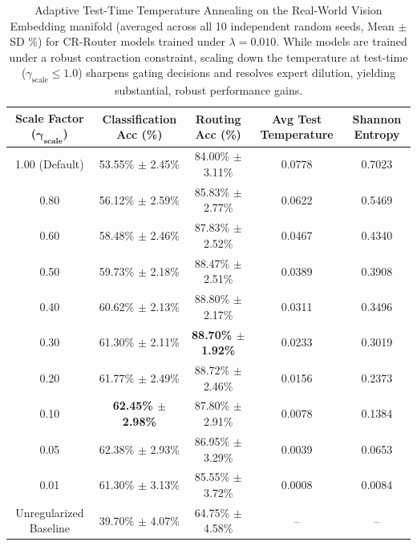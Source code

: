 \begin{table}[t]
\centering
\small
\caption{Adaptive Test-Time Temperature Annealing on the Real-World Vision Embedding manifold (averaged across all 10 independent random seeds, Mean $\pm$ SD \%) for CR-Router models trained under $\lambda = 0.010$. While models are trained under a robust contraction constraint, scaling down the temperature at test-time ($\gamma_{\text{scale}} \le 1.0$) sharpens gating decisions and resolves expert dilution, yielding substantial, robust performance gains.}
\vskip 0.15in
\label{tab:temperature_annealing}
\begin{tabular}{ccccc}
\toprule
\textbf{Scale Factor ($\boldsymbol{\gamma_{\text{scale}}}$)} & \textbf{Classification Acc (\%)} & \textbf{Routing Acc (\%)} & \textbf{Avg Test Temperature} & \textbf{Shannon Entropy} \\
\midrule
1.00 (Default) & 53.55\% $\pm$ 2.45\% & 84.00\% $\pm$ 3.11\% & 0.0778 & 0.7023 \\
0.80 & 56.12\% $\pm$ 2.59\% & 85.83\% $\pm$ 2.77\% & 0.0622 & 0.5469 \\
0.60 & 58.48\% $\pm$ 2.46\% & 87.83\% $\pm$ 2.52\% & 0.0467 & 0.4340 \\
0.50 & 59.73\% $\pm$ 2.18\% & 88.47\% $\pm$ 2.51\% & 0.0389 & 0.3908 \\
0.40 & 60.62\% $\pm$ 2.13\% & 88.80\% $\pm$ 2.17\% & 0.0311 & 0.3496 \\
0.30 & 61.30\% $\pm$ 2.11\% & \textbf{88.70\% $\pm$ 1.92\%} & 0.0233 & 0.3019 \\
0.20 & 61.77\% $\pm$ 2.49\% & 88.72\% $\pm$ 2.46\% & 0.0156 & 0.2373 \\
0.10 & \textbf{62.45\% $\pm$ 2.98\%} & 87.80\% $\pm$ 2.91\% & 0.0078 & 0.1384 \\
0.05 & 62.38\% $\pm$ 2.93\% & 86.95\% $\pm$ 3.29\% & 0.0039 & 0.0653 \\
0.01 & 61.30\% $\pm$ 3.13\% & 85.55\% $\pm$ 3.72\% & 0.0008 & 0.0084 \\
\midrule
Unregularized Baseline & 39.70\% $\pm$ 4.07\% & 64.75\% $\pm$ 4.58\% & -- & -- \\
\bottomrule
\end{tabular}
\end{table}

